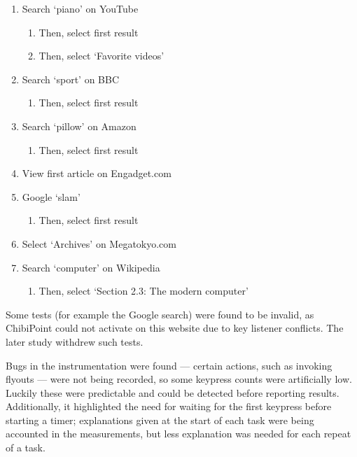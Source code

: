 \documentclass[11pt,openright,a4paper]{report}
\begin{document}
\begin{enumerate}
\item Search `piano' on YouTube
	\begin{enumerate}
        \item Then, select first result
        \item Then, select `Favorite videos'
    \end{enumerate}
	
\item Search `sport' on BBC
	\begin{enumerate}
		\item Then, select first result
	\end{enumerate}
	
\item Search `pillow' on Amazon
	\begin{enumerate}
		\item Then, select first result
	\end{enumerate}

\item View first article on Engadget.com

\item Google `slam'
	\begin{enumerate}
		\item Then, select first result
	\end{enumerate}

\item Select `Archives' on Megatokyo.com

\item Search `computer' on Wikipedia
	\begin{enumerate}
		\item Then, select `Section 2.3: The modern computer'
	\end{enumerate}
\end{enumerate}

Some tests (for example the Google search) were found to be invalid, as ChibiPoint could not activate on this website due to key listener conflicts. The later study withdrew such tests.

Bugs in the instrumentation were found --- certain actions, such as invoking flyouts --- were not being recorded, so some keypress counts were artificially low. Luckily these were predictable and could be detected before reporting results. Additionally, it highlighted the need for waiting for the first keypress before starting a timer; explanations given at the start of each task were being accounted in the measurements, but less explanation was needed for each repeat of a task.
\end{document}
